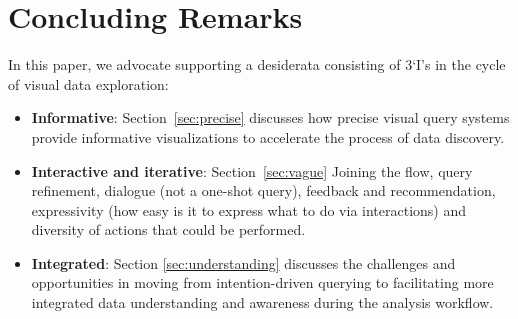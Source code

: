 \section{Concluding Remarks\label{sec:conclusion}}


In this paper, we advocate supporting a desiderata consisting of  3`I's in the cycle of visual data exploration:
\begin{itemize}
	\item \textbf{Informative}: Section~\ref{sec:precise} discusses how precise visual query systems provide informative visualizations to accelerate the process of data discovery. 
	\item \textbf{Interactive and iterative}: Section~\ref{sec:vague}
	Joining the flow, query refinement, dialogue (not a one-shot query), feedback and recommendation, expressivity (how easy is it to express what to do via interactions) and diversity of actions that could be performed.
	\item \textbf{Integrated}: Section \ref{sec:understanding} discusses the challenges and opportunities in moving from intention-driven querying to facilitating more integrated data understanding and awareness during the analysis workflow.
\end{itemize}